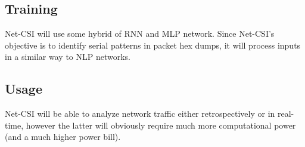 \documentclass{article}
\begin{document}
\subsection*{Training}
Net-CSI will use some hybrid of RNN and MLP network. Since Net-CSI's objective is to identify serial patterns in packet hex dumps, it will process inputs in a similar way to NLP networks.

\subsection*{Usage}
Net-CSI will be able to analyze network traffic either retrospectively or in real-time, however the latter will obviously require much more computational power (and a much higher power bill).
\end{document}
